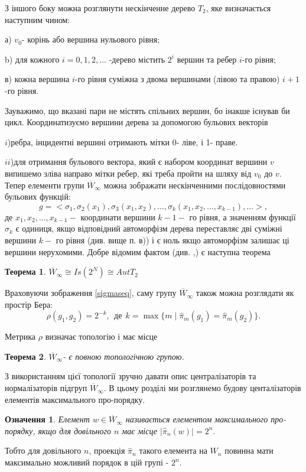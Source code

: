 \documentclass[a4paper,12pt]{article} \usepackage{a4wide}
\numberwithin{equation}{subsection}
\newtheorem{theorem}{Теорема}[subsection]
\newtheorem{definition}{Означення}[subsection]
\begin{document}
  З іншого боку можна розглянути нескінченне дерево $T_2$, яке
  визначається наступним чином:
  \begin{description}
\item{а)} $v_0$- корінь або вершина нульового рівня;
\item{b)} для кожного $ i=0,1,2,...$ -дерево містить $ 2^i$ вершин та ребер $i$-го рівня;
\item{в)} кожна вершина $i$-го рівня суміжна з двома вершинами (лівою та
  правою) $i+1$-го рівня.
 \end{description}

   Зауважимо, що вказані пари не містять
  спільних вершин, бо інакше існував би цикл.
  Координатизуємо вершини дерева за допомогою бульових векторів

  $i$)ребра, інцидентні вершині отримають мітки 0- ліве, і 1-
  праве.

  $ii$)для отримання бульового вектора, який є набором координат вершини $v$
   випишемо зліва направо мітки ребер, які треба пройти на шляху від $v_0$ до $v.$
   Тепер  елементи групи $\overline{W}_\infty $ можна  зображати
  нескінченними  послідовностями бульових функцій:
\begin{equation} \label{sigmaseq}
   g=<\sigma_1,\sigma_2(x_1),\sigma_3(x_1,x_2), \ldots ,\sigma_k(x_1,x_2,...,x_{k-1}), \ldots >,
\end{equation}
   де $x_1,x_2,...,x_{k-1} -$ координати вершини $k-1-$ го рівня, а значенням функції $\sigma_k$ є одиниця,
   якщо відповідний автоморфізм дерева переставляє дві суміжні вершини $k-$ го рівня (див. вище п. в)) і є ноль
   якщо автоморфізм залишає ці вершини нерухомими.
   Добре відомим фактом (див. \cite{Sch1},\cite{Sch2})
   є наступна теорема
 \begin{theorem}
   $\overline{W}_\infty \cong Is(2^N)\cong Aut T_2$
\end{theorem}

Враховуючи зображення \eqref{sigmaseq}, саму групу $\overline{W}_\infty $   також   можна розглядати як простір Бера:
   \[ \rho(g_1,g_2)=2^{-k}, \ \      \text{де} \ \
     k = \max \{ m \mid \hat{\pi}_m(g_1)=\hat{\pi}_m(g_2) \}.\]


    Метрика $\rho$ визначає топологію  і має місце

    \begin{theorem} \label{topgroup}
    $\overline{W}_\infty $- є повною топологічною групою.
\end{theorem}


З використанням цієї топології зручно давати опис централізаторів та нормалізаторів підгруп $\overline{W}_\infty .$ В
цьому розділі ми розглянемо будову центалізаторів елементів максимального про-порядку.
\begin{definition} Елемент $w \in \overline{W}_\infty $ називається елементом максимального
про-порядку, якщо   для довільного $n$ має місце  $ \mid \hat{\pi}_n(w) \mid =2^n.$
\end{definition}
Тобто для довільного $n$, проекція $\hat{\pi}_n$ такого елемента на $W_n$ повинна мати максимально можливий порядок в
цій групі - $2^n.$
\end{document}
